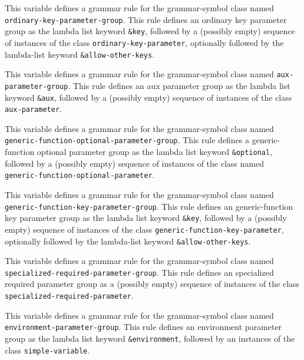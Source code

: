 
This variable defines a grammar rule for the grammar-symbol class
named \texttt{ordinary-key-parameter-group}.  This rule defines
an ordinary key parameter group as the lambda list keyword
\texttt{\&key}, followed by a (possibly empty) sequence of
instances of the class \texttt{ordinary-key-parameter}, optionally
followed by the lambda-list keyword \texttt{\&allow-other-keys}.


This variable defines a grammar rule for the grammar-symbol class
named \texttt{aux-parameter-group}.  This rule defines an aux
parameter group as the lambda list keyword \texttt{\&aux}, followed by
a (possibly empty) sequence of instances of the class
\texttt{aux-parameter}.


This variable defines a grammar rule for the grammar-symbol class
named \texttt{generic-function-optional-parameter-group}.  This rule
defines a generic-function optional parameter group as the lambda list
keyword \texttt{\&optional}, followed by a (possibly empty) sequence
of instances of the class named\\
\texttt{generic-function-optional-parameter}.


This variable defines a grammar rule for the grammar-symbol class
named \texttt{generic-function-key-parameter-group}.  This rule
defines an generic-function key parameter group as the lambda list
keyword \texttt{\&key}, followed by a (possibly empty) sequence of
instances of the class \texttt{generic-function-key-parameter},
optionally followed by the lambda-list keyword
\texttt{\&allow-other-keys}.


This variable defines a grammar rule for the grammar-symbol class
named \texttt{specialized-required-parameter-group}.  This rule
defines an specialized required parameter group as a (possibly empty)
sequence of instances of the class
\texttt{specialized-required-parameter}.


This variable defines a grammar rule for the grammar-symbol class
named \texttt{environment-parameter-group}.  This rule defines an
environment parameter group as the lambda list keyword
\texttt{\&environment}, followed by an instances of the class
\texttt{simple-variable}.

